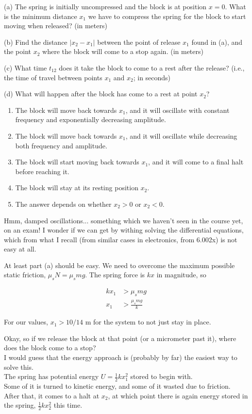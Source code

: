 \documentclass[8.01x]{subfiles}
\begin{document}
(a) The spring is initially uncompressed and the block is at position $x = 0$. What is the minimum distance $x_1$ we have to compress the spring for the block to start moving when released? (in meters)

(b) Find the distance $|x_2 - x_1|$ between the point of release $x_1$ found in (a), and the point $x_2$ where the block will come to a stop again. (in meters)

(c) What time $t_{12}$ does it take the block to come to a rest after the release? (i.e., the time of travel between points $x_1$ and $x_2$; in seconds)

(d) What will happen after the block has come to a rest at point $x_2$?

\begin{enumerate}
\item The block will move back towards $x_1$, and it will oscillate with constant frequency and exponentially decreasing amplitude.
\item The block will move back towards $x_1$, and it will oscillate while decreasing both frequency and amplitude.
\item The block will start moving back towards $x_1$, and it will come to a final halt before reaching it.
\item The block will stay at its resting position $x_2$.
\item The answer depends on whether $x_2 > 0$ or $x_2 < 0$.
\end{enumerate}

Hmm, damped oscillations... something which we haven't seen in the course yet, on an exam! I wonder if we can get by withing solving the differential equations, which from what I recall (from similar cases in electronics, from 6.002x) is not easy at all.

At least part (a) should be easy. We need to overcome the maximum possible static friction, $\mu_s N = \mu_s m g$. The spring force is $k x$ in magnitude, so

\begin{align}
k x_1 &> \mu_s m g\\
x_1 &> \frac{\mu_s m g}{k}
\end{align}

For our values, $x_1 > 10/14$ m for the system to not just stay in place.

Okay, so if we release the block at that point (or a micrometer past it), where does the block come to a stop?\\
I would guess that the energy approach is (probably by far) the easiest way to solve this.\\
The spring has potential energy $U = \displaystyle \frac{1}{2} k x_1^2$ stored to begin with.\\
Some of it is turned to kinetic energy, and some of it wasted due to friction.\\
After that, it comes to a halt at $x_2$, at which point there is again energy stored in the spring, $\displaystyle \frac{1}{2} k x_2^2$ this time.
\end{document}

